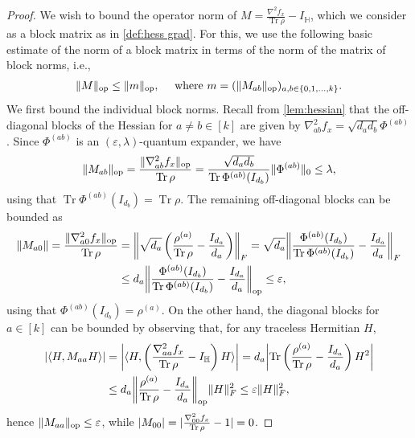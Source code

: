 \documentclass[aos]{imsart}
\theoremstyle{definition}
\numberwithin{equation}{section}
\DeclareMathOperator{\op}{op}
\DeclareMathOperator{\tr}{Tr}
\DeclarePairedDelimiter{\abs}{\lvert}{\rvert}
\DeclarePairedDelimiter{\norm}{\lVert}{\rVert}
\renewcommand{\H}{{\mathbb{H}}}
\newcommand{\eps}{\varepsilon}
\newcommand{\samp}{x}
\begin{document}
\begin{proof}
We wish to bound the operator norm of $M = \frac{\nabla^2 f_\samp}{\tr \rho} - I_\H$, which we consider as a block matrix as in \cref{def:hess grad}.
For this, we use the following basic estimate of the norm of a block matrix in terms of the norm of the matrix of block norms, i.e.,
\begin{align}\label{eq:baby norm bounds}
  \norm{M}_{\op} \leq \norm{m}_{\op},
\quad \text{ where } m=(\norm{M_{ab}}_{\op})_{a,b\in\{0,1,\dots,k\}}.
\end{align}
We first bound the individual block norms.
Recall from \cref{lem:hessian} that the off-diagonal blocks of the Hessian for $a \neq b\in[k]$ are given by $\nabla^2_{ab} f_x = \sqrt{d_a d_b} \Phi^{(ab)}$.
Since $\Phi^{(ab)}$ is an $(\eps,\lambda)$-quantum expander, we have
\begin{align*}
  \norm{M_{ab}}_{\op}
= \frac{\norm{\nabla^2_{ab} f_x}_{\op}}{\tr\rho}
= \frac{\sqrt{d_a d_b}}{\tr \Phi^{(ab)}(I_{d_b})} \norm{\Phi^{(ab)}}_0
\leq \lambda,
\end{align*}
using that $\tr \Phi^{(ab)}(I_{d_b}) = \tr \rho$.
The remaining off-diagonal blocks can be bounded as
\begin{align*}
\norm{M_{a0}}
= \frac{\norm{\nabla^2_{a0} f_x}_{\op}}{\tr \rho}
&= \norm*{\sqrt{d_a} \left( \frac{\rho^{(a)}}{\tr \rho} - \frac{I_{d_a}}{d_a} \right)}_F
= \sqrt{d_a} \norm*{\frac{\Phi^{(ab)}(I_{d_b})}{\tr \Phi^{(ab)}(I_{d_b})} - \frac{I_{d_a}}{d_a}}_F \\
&\leq d_a \norm*{\frac{\Phi^{(ab)}(I_{d_b})}{\tr \Phi^{(ab)}(I_{d_b})} - \frac{I_{d_a}}{d_a}}_{\op}
\leq \eps,
\end{align*}
using that $\Phi^{(ab)}(I_{d_b}) = \rho^{(a)}$.
On the other hand, the diagonal blocks for $a\in[k]$ can be bounded by observing that, for any traceless Hermitian $H$,
\begin{align*}
  \abs{\braket{H, M_{aa} H}}
&= \abs*{\braket{H, \left( \frac{\nabla^2_{aa} f_x}{\tr \rho} - I_\H \right) H}}
= d_a \abs*{\tr \left( \frac{\rho^{(a)}}{\tr \rho} - \frac{I_{d_a}}{d_a} \right) H^2} \\
&\leq d_a \norm*{\frac{\rho^{(a)}}{\tr \rho} - \frac{I_{d_a}}{d_a}}_{\op} \norm{H}_F^2
\leq \eps \norm H_F^2,
\end{align*}
hence $\norm{M_{aa}}_{\op} \leq \eps$, while $\abs{M_{00}} = \abs{\frac{\nabla^2_{00} f_x}{\tr \rho} - 1} = 0$.

\end{proof}
\end{document}
